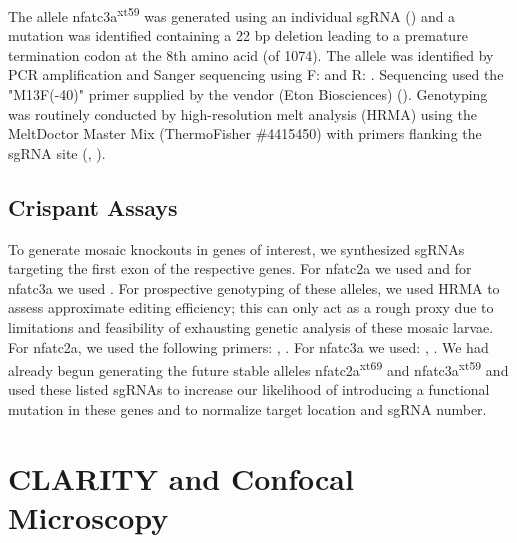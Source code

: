 The allele nfatc3a\textsuperscript{xt59} was generated using an individual sgRNA () and a mutation was identified containing a 22 bp deletion leading to a premature termination codon at the 8th amino acid (of 1074). The allele was identified by PCR amplification and Sanger sequencing using F:  and R: . Sequencing used the "M13F(-40)" primer supplied by the vendor (Eton Biosciences) (). Genotyping was routinely conducted by high-resolution melt analysis (HRMA) using the MeltDoctor Master Mix (ThermoFisher \#4415450) with primers flanking the sgRNA site (, ). 

\subsection{Crispant Assays}

To generate mosaic knockouts in genes of interest, we synthesized sgRNAs targeting the first exon of the respective genes. For nfatc2a we used  and for nfatc3a we used . For prospective genotyping of these alleles, we used HRMA to assess approximate editing efficiency; this can only act as a rough proxy due to limitations and feasibility of exhausting genetic analysis of these mosaic larvae. For nfatc2a, we used the following primers: , . For nfatc3a we used: , . We had already begun generating the future stable alleles nfatc2a\textsuperscript{xt69} and nfatc3a\textsuperscript{xt59} and used these listed sgRNAs to increase our likelihood of introducing a functional mutation in these genes and to normalize target location and sgRNA number.


\section{CLARITY and Confocal Microscopy}

\citep{Yang2014d}
\citep{Cronan2015}
\citep{Chung2013}

